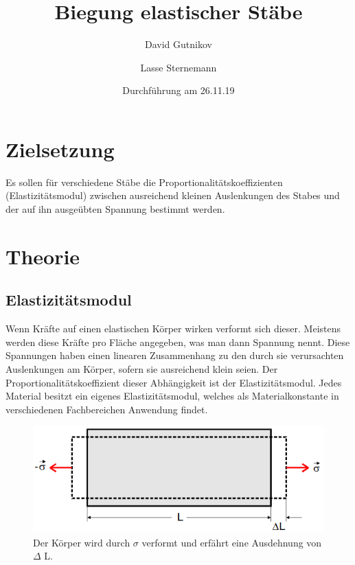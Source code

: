 \documentclass[titlepage = firstcover]{scrartcl}
\title{Biegung elastischer Stäbe}
\author{David Gutnikov \and Lasse Sternemann \newline
        }
\date{Durchführung am 26.11.19}
\begin{document}
    \maketitle
    \tableofcontents
    \newpage
    
    \section{Zielsetzung}
      Es sollen für verschiedene Stäbe die Proportionalitätskoeffizienten (Elastizitätsmodul) zwischen ausreichend kleinen Auslenkungen des Stabes und der auf ihn ausgeübten Spannung bestimmt werden.

    \section{Theorie}
      \subsection{Elastizitätsmodul}
        Wenn Kräfte auf einen elastischen Körper wirken verformt sich dieser. Meistens werden diese Kräfte pro Fläche angegeben, was man dann Spannung nennt.
        Diese Spannungen haben einen linearen Zusammenhang zu den durch sie verursachten Auslenkungen am Körper, sofern sie ausreichend klein seien.
        Der Proportionalitätskoeffizient dieser Abhängigkeit ist der Elastizitätsmodul. Jedes Material besitzt ein eigenes Elastizitätsmodul, welches als Materialkonstante in verschiedenen Fachbereichen Anwendung findet.
        \begin{figure}[h]
          \centering
          \includegraphics[width=0.75\linewidth]{Verformung.png}
          \caption{Der Körper wird durch $\sigma$ verformt und erfährt eine Ausdehnung von $\Delta$ L.}
          \label{fig:verformung}
        \end{figure}
\end{document}
